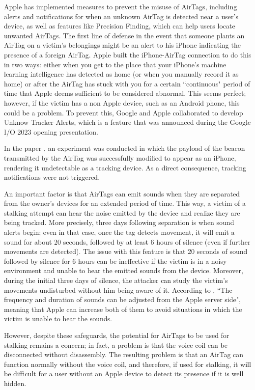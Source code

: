 \documentclass[english]{article}
\begin{document}
Apple has implemented measures to prevent the misuse of AirTags, including alerts and notifications for when an unknown AirTag is detected near a user's device, as well as features like Precision Finding, which can help users locate unwanted AirTags. The first line of defense in the event that someone plants an AirTag on a victim's belongings might be an alert to his iPhone indicating the presence of a foreign AirTag. Apple built the iPhone-AirTag connection to do this in two ways: either when you get to the place that your iPhone's machine learning intelligence has detected as home (or when you manually record it as home) or after the AirTag has stuck with you for a certain ``continuous" period of time that Apple deems sufficient to be considered abnormal. This seems perfect; however, if the victim has a non Apple device, such as an Android phone, this could be a problem. To prevent this, Google and Apple collaborated to develop Unknow Tracker Alerts, which is a feature that was announced during the Google I/O 2023 opening presentation.

In the paper \cite{shafqat2023track}, an experiment was conducted in which the payload of the beacon transmitted by the AirTag was successfully modified to appear as an iPhone, rendering it undetectable as a tracking device. As a direct consequence, tracking notifications were not triggered.

An important factor is that AirTags can emit sounds when they are separated from the owner's devices for an extended period of time. This way, a victim of a stalking attempt can hear the noise emitted by the device and realize they are being tracked. More precisely, three days following separation is when sound alerts begin; even in that case, once the tag detects movement, it will emit a sound for about 20 seconds, followed by at least 6 hours of silence (even if further movements are detected). The issue with this feature is that 20 seconds of sound followed by silence for 6 hours can be ineffective if the victim is in a noisy environment and unable to hear the emitted sounds from the device. Moreover, during the initial three days of silence, the attacker can study the victim's movements undisturbed without him being aware of it. According to \cite{server}, ``The frequency and duration of sounds can be adjusted from the Apple server side", meaning that Apple can increase both of them to avoid situations in which the victim is unable to hear the sounds.

However, despite these safeguards, the potential for AirTags to be used for stalking remains a concern; in fact, a problem is that the voice coil can be disconnected without disassembly. The resulting problem is that an AirTag can function normally without the voice coil, and therefore, if used for stalking, it will be difficult for a user without an Apple device to detect its presence if it is well hidden.
\end{document}
